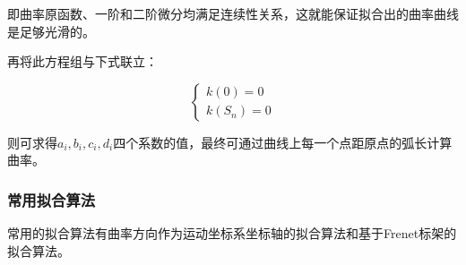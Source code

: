\begin{enumerate}[label=(\Alph*)]
    即曲率原函数、一阶和二阶微分均满足连续性关系，这就能保证拟合出的曲率曲线是足够光滑的。

    再将此方程组与下式联立：

    \begin{equation}
    \left\{
        \begin{array}{lr}
        k(0) = 0
    \\
        k(S_n) = 0
        \end{array}
    \right.
    \end{equation}

    则可求得$a_i, b_i, c_i, d_i$四个系数的值，最终可通过曲线上每一个点距原点的弧长计算曲率。
\end{enumerate}

\subsubsection{常用拟合算法}

常用的拟合算法有曲率方向作为运动坐标系坐标轴的拟合算法和基于Frenet标架的拟合算法。

